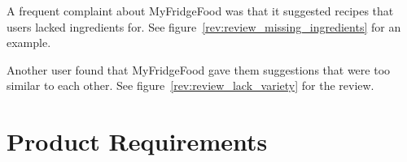 A frequent complaint about MyFridgeFood was that it suggested
recipes that users lacked ingredients for. See figure~\ref{rev:review_missing_ingredients} for an example.

Another user found that MyFridgeFood gave them suggestions that were too similar to each
other. See figure~\ref{rev:review_lack_variety} for the review.

\section{Product Requirements}

\newcommand{\requirementtype}{FR}
\newcommand{\requirement}[4]{
    \requirementtype\stepcounter{functionalreqcounter}\arabic{functionalreqcounter}
        &
    \raggedright#1
        &
    #2
        &
    #3
        &
    #4
        \\
}

